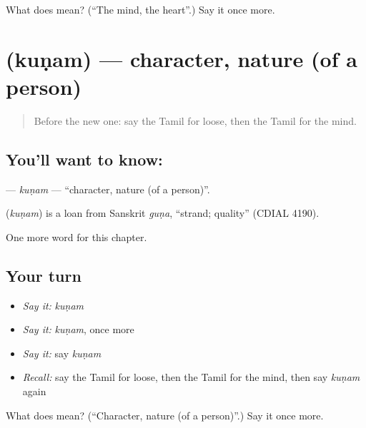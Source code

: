 \begin{tcolorbox}[breakable,colback=teal!4,colframe=teal!35!black,title={Before you move on}]
What does  mean? (\textquotedblleft{}The mind, the heart\textquotedblright{}.) Say it once more.
\end{tcolorbox}
\section[\texorpdfstring{\ta{குணம்} (kuṇam)}{குணம் (kuṇam)}]{ (kuṇam) — character, nature (of a person)}

\label{lesson:TA-C210-kunam}



\begin{quote}
Before the new one: say the Tamil for loose, then the Tamil for the mind.
\end{quote}

\subsection*{You'll want to know: }
\textbf{} — \emph{kuṇam} — \textquotedblleft{}character, nature (of a person)\textquotedblright{}.

\begin{cousinweb}
\textbf{} (\emph{kuṇam}) is a loan from Sanskrit \emph{guṇa}, \textquotedblleft{}strand; quality\textquotedblright{} (CDIAL 4190).
\end{cousinweb}

\begin{grammarlens}[title={What you've built}]
One more word for this chapter.
\end{grammarlens}

\subsection*{Your turn}
\begin{itemize}
\raggedright
  \item \emph{Say it:} \emph{kuṇam}
  \item \emph{Say it:} \emph{kuṇam}, once more
  \item \emph{Say it:} say \emph{kuṇam}
  \item \emph{Recall:} say the Tamil for loose, then the Tamil for the mind, then say \emph{kuṇam} again
\end{itemize}

\begin{tcolorbox}[breakable,colback=teal!4,colframe=teal!35!black,title={Before you move on}]
What does  mean? (\textquotedblleft{}Character, nature (of a person)\textquotedblright{}.) Say it once more.
\end{tcolorbox}
